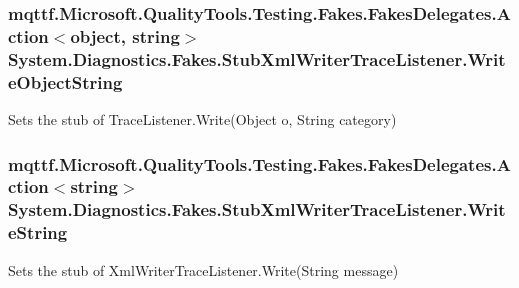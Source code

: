 \hypertarget{class_system_1_1_diagnostics_1_1_fakes_1_1_stub_xml_writer_trace_listener_aef17d4915c09f8b9f851f15f70b5b960}{
\subsubsection[{Write\-Object\-String}]{\setlength{\rightskip}{0pt plus 5cm}mqttf.\-Microsoft.\-Quality\-Tools.\-Testing.\-Fakes.\-Fakes\-Delegates.\-Action$<$object, string$>$ System.\-Diagnostics.\-Fakes.\-Stub\-Xml\-Writer\-Trace\-Listener.\-Write\-Object\-String}}\label{class_system_1_1_diagnostics_1_1_fakes_1_1_stub_xml_writer_trace_listener_aef17d4915c09f8b9f851f15f70b5b960}


Sets the stub of Trace\-Listener.\-Write(\-Object o, String category)

\hypertarget{class_system_1_1_diagnostics_1_1_fakes_1_1_stub_xml_writer_trace_listener_a538f1248186f4afc78944d3dfe1f847d}{
\subsubsection[{Write\-String}]{\setlength{\rightskip}{0pt plus 5cm}mqttf.\-Microsoft.\-Quality\-Tools.\-Testing.\-Fakes.\-Fakes\-Delegates.\-Action$<$string$>$ System.\-Diagnostics.\-Fakes.\-Stub\-Xml\-Writer\-Trace\-Listener.\-Write\-String}}\label{class_system_1_1_diagnostics_1_1_fakes_1_1_stub_xml_writer_trace_listener_a538f1248186f4afc78944d3dfe1f847d}


Sets the stub of Xml\-Writer\-Trace\-Listener.\-Write(\-String message)

